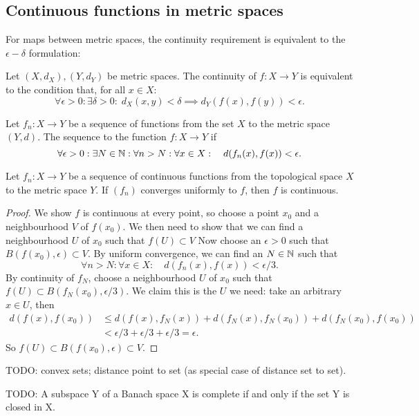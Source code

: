 \subsection{Continuous functions in metric spaces}
For maps between metric spaces, the continuity requirement is equivalent to the $\epsilon-\delta$ formulation:
\begin{proposition}
Let $(X,d_X), (Y,d_Y)$ be metric spaces. The continuity of $f:X\to Y$ is equivalent to the condition that, for all $x\in X$:
\[ \forall \epsilon>0:\exists \delta>0:\; d_X(x,y)<\delta \implies d_Y(f(x),f(y))<\epsilon. \]
\end{proposition}
\begin{definition}
Let $f_n:X\to Y$ be a sequence of functions from the set $X$ to the metric space $(Y,d)$. The sequence  to the function $f:X\to Y$ if
\[ \forall \epsilon>0:\exists N\in \mathbb{N}:\forall n>N:\forall x\in X: \quad d(f_n(x),f(x))<\epsilon.  \]
\end{definition}
\begin{theorem}
Let $f_n:X\to Y$ be a sequence of continuous functions from the topological space $X$ to the metric space $Y$. If $(f_n)$ converges uniformly to $f$, then $f$ is continuous.
\end{theorem}
\begin{proof}
We show $f$ is continuous at every point, so choose a point $x_0$ and a neighbourhood $V$ of $f(x_0)$. We then need to show that we can find a neighbourhood $U$ of $x_0$ such that $f(U)\subset V$ Now choose an $\epsilon>0$ such that $B(f(x_0), \epsilon)\subset V$. By uniform convergence, we can find an $N\in\mathbb{N}$ such that
\[\forall n>N:\forall x \in X:\quad d(f_n(x),f(x))<\epsilon/3.\]
By continuity of $f_N$, choose a neighbourhood $U$ of $x_0$ such that $f(U)\subset B(f_N(x_0),\epsilon/3)$. We claim this is the $U$ we need: take an arbitrary $x\in U$, then
\begin{align*}
d(f(x),f(x_0))&\leq d(f(x), f_N(x)) + d(f_N(x), f_N(x_0)) + d(f_N(x_0),f(x_0)) \\
&< \epsilon/3 + \epsilon/3 + \epsilon/3 = \epsilon.
\end{align*}
So $f(U)\subset B(f(x_0), \epsilon)\subset V$.
\end{proof}

TODO: convex sets; distance point to set (as special case of distance set to set).

TODO: A subspace Y of a Banach space X is complete if and only if the set Y is closed in X.

